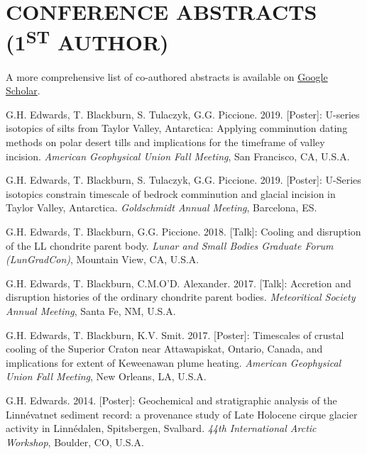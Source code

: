 \documentclass[10pt]{article}
\begin{document}

\section*{CONFERENCE ABSTRACTS (1\textsuperscript{\tiny{ST}} AUTHOR)}

\begin{center} A more comprehensive list of co-authored abstracts is available on \href{https://scholar.google.com/citations?user=KHLOvgcAAAAJ&hl=en}{Google Scholar}. \end{center}

\begin{etaremune} [itemsep=4pt, leftmargin=3ex]
  \item G.H. Edwards, T. Blackburn, S. Tulaczyk, G.G. Piccione. 2019. [Poster]: U-series isotopics of silts from Taylor Valley, Antarctica: Applying comminution dating methods on polar desert tills and implications for the timeframe of valley incision. \textit{American Geophysical Union Fall Meeting}, San Francisco, CA, U.S.A.
  \item  G.H. Edwards, T. Blackburn, S. Tulaczyk, G.G. Piccione. 2019. [Poster]: U-Series isotopics constrain timescale of bedrock comminution and glacial incision in Taylor Valley, Antarctica. \textit{Goldschmidt Annual Meeting}, Barcelona, ES.
	\item  G.H. Edwards, T. Blackburn, G.G. Piccione. 2018. [Talk]: Cooling and disruption of the LL chondrite parent body. \textit{Lunar and Small Bodies Graduate Forum (LunGradCon)}, Mountain View, CA, U.S.A.
  \item  G.H. Edwards, T. Blackburn, C.M.O’D. Alexander. 2017. [Talk]: Accretion and disruption histories of the ordinary chondrite parent bodies. \textit{Meteoritical Society Annual Meeting}, Santa Fe, NM, U.S.A.
  \item G.H. Edwards, T. Blackburn, K.V. Smit. 2017. [Poster]: Timescales of crustal cooling of the Superior Craton near Attawapiskat, Ontario, Canada, and implications for extent of Keweenawan plume heating. \textit{American Geophysical Union Fall Meeting}, New Orleans, LA, U.S.A.
  \item G.H. Edwards. 2014. [Poster]: Geochemical and stratigraphic analysis of the Linnévatnet sediment record: a provenance study of Late Holocene cirque glacier activity in Linnédalen, Spitsbergen, Svalbard. \textit{44th International Arctic Workshop}, Boulder, CO, U.S.A.
\end{etaremune}
\vspace{-12pt}
\end{document}
